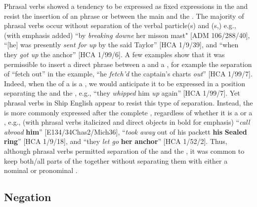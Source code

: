 Phrasal verbs showed a tendency to be expressed as fixed expressions in the  and resist the insertion of an  phrase or  between the main  and the . The majority of phrasal verbs occur without separation of the verbal particle(s) and (s,) e.g., (with emphasis added) “by \textit{breaking downe} her misson mast" [ADM 106/288/40], “[he] was presently \textit{sent for up} by the said Taylor” [HCA 1/9/39], and “when they \textit{got up} the anchor” [HCA 1/99/6]. A few examples show that it was permissible to insert a direct  phrase between a  and a , for example the separation of “fetch out” in the example, “he \textit{fetch’d} the captain’s charts \textit{out}” [HCA 1/99/7]. Indeed, when the  of a   is a , we would anticipate it to be expressed in a position separating the  and the , e.g., “they \textit{whipped} him \textit{up} again” [HCA 1/99/7]. Yet phrasal verbs in Ship English appear to resist this type of separation. Instead, the  is more commonly expressed after the complete , regardless of whether it is a  or a , e.g., (with phrasal verbs italicized and direct objects in bold for emphasis) “\textit{call abroad} \textbf{him}” [E134/34Chas2/Mich36], “\textit{took away} out of his packett \textbf{his} \textbf{Sealed} \textbf{ring}” [HCA 1/9/18], and “they \textit{let go} \textbf{her} \textbf{anchor}” [HCA 1/52/2]. Thus, although phrasal verbs permitted separation of the  and the , it was common to keep both/all parts of the  together without separating them with either a nominal or pronominal . 

\subsection{{Negation}}\label{sec:6.1.3}

